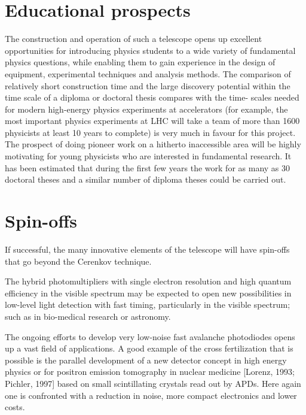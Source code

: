 \cleardoublepage

\chapter{Educational prospects}


\medskip The construction and operation of such a telescope opens up excellent
opportunities for introducing physics students to a wide variety of
fundamental physics questions, while enabling them to gain experience in the
design of equipment, experimental techniques and analysis methods. The
comparison of
relatively short construction time and the large discovery potential within
the time scale of a diploma or doctoral thesis compares with
the time- scales needed for modern high-energy physics experiments at
accelerators (for example, the most important physics experiments at LHC
will take a team of more than 1600 physicists at least 10 years to
complete) is very much in favour for
this project. The prospect of doing pioneer work on a hitherto inaccessible
area will be highly motivating for young physicists who are interested in
fundamental research. It has been estimated that during the first few years
the work for as many as 30 doctoral theses and a similar number of diploma
theses could be carried out.

\cleardoublepage
\chapter{Spin-offs}


\medskip If successful, the many innovative elements of the telescope will
have spin-offs that go beyond the Cerenkov technique.

The hybrid photomultipliers with single electron resolution and high quantum
efficiency in the visible spectrum may be expected to open new possibilities
in low-level light detection with fast timing, particularly in the visible
spectrum; such as in bio-medical research or astronomy.

The ongoing efforts to develop very low-noise fast avalanche photodiodes
opens up a vast field of applications. A good example of the cross
fertilization that is possible is the parallel development of a new detector
concept in high energy physics or for positron emission tomography in
nuclear medicine [Lorenz, 1993; Pichler, 1997] based on small scintillating
crystals read out by APDs. Here again one is confronted with a reduction in
noise, more compact electronics and lower costs.

